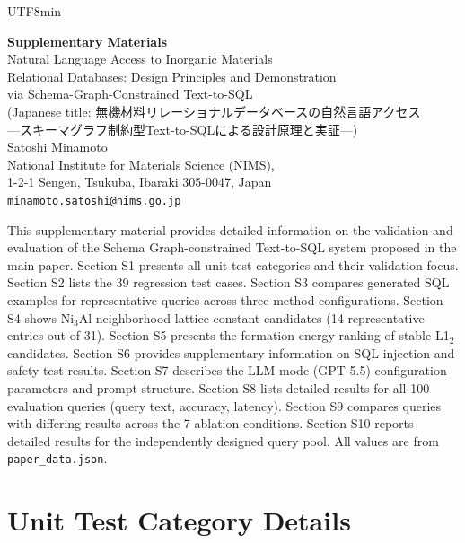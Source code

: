 \documentclass[sn-mathphys,Numbered]{sn-jnl}
\begin{document}
\begin{CJK}{UTF8}{min}
\begin{center}
  {\LARGE\bfseries Supplementary Materials}\\[0.8em]
  {\large Natural Language Access to Inorganic Materials\\
  Relational Databases: Design Principles and Demonstration\\
  via Schema-Graph-Constrained Text-to-SQL}\\[0.5em]
  {\large (Japanese title: 無機材料リレーショナルデータベースの自然言語アクセス\\
  ---スキーマグラフ制約型Text-to-SQLによる設計原理と実証---)}\\[1.0em]
  {\normalsize Satoshi Minamoto}\\[0.3em]
  {\small National Institute for Materials Science (NIMS),\\
  1-2-1 Sengen, Tsukuba, Ibaraki 305-0047, Japan}\\[0.3em]
  {\small \texttt{minamoto.satoshi@nims.go.jp}}
\end{center}
\vspace{1.0em}
\noindent\hrulefill
\vspace{1.0em}

\noindent
This supplementary material provides detailed information on
the validation and evaluation of the Schema Graph-constrained
Text-to-SQL system proposed in the main paper.
Section S1 presents all unit test categories and their validation
focus.
Section S2 lists the 39 regression test cases.
Section S3 compares generated SQL examples for representative
queries across three method configurations.
Section S4 shows Ni$_3$Al neighborhood lattice constant candidates
(14 representative entries out of 31).
Section S5 presents the formation energy ranking of stable L1$_2$
candidates.
Section S6 provides supplementary information on SQL injection and
safety test results.
Section S7 describes the LLM mode (GPT-5.5) configuration
parameters and prompt structure.
Section S8 lists detailed results for all 100 evaluation queries
(query text, accuracy, latency).
Section S9 compares queries with differing results across the 7
ablation conditions.
Section S10 reports detailed results for the independently designed
query pool.
All values are from \texttt{paper\_data.json}.

\section{Unit Test Category Details}
\label{sec:sup_test_categories}


\end{CJK}
\end{document}
